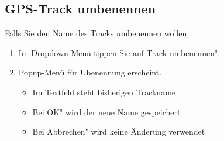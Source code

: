 \documentclass{article}
\begin{document}
\subsection{GPS-Track umbenennen}
	Falls Sie den Name des Tracks umbenennen wollen,
	\begin{enumerate}
		\item Im Dropdown-Menü tippen Sie auf \glqq Track umbenennen".
		\item Popup-Menü für Ubenennung erscheint.
		\begin{itemize}
			\item Im Textfeld steht bisherigen Trackname
			\item Bei \glqq OK" wird der neue Name gespeichert
			\item Bei \glqq Abbrechen" wird keine Änderung verwendet	
		\end{itemize}
	\end{enumerate}
\end{document}
